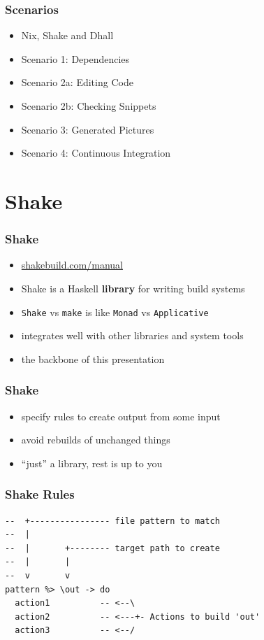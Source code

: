 \documentclass{beamer}
\begin{document}
\begin{frame}
  \frametitle{Scenarios}
  \begin{itemize}
  \item Nix, Shake and Dhall
  \item Scenario 1: Dependencies
  \item Scenario 2a: Editing Code
  \item Scenario 2b: Checking Snippets
  \item Scenario 3: Generated Pictures
  \item Scenario 4: Continuous Integration
  \end{itemize}
\end{frame}

\section{Shake}

\begin{frame}
  \frametitle{Shake}
  \begin{itemize}
  \item \url{shakebuild.com/manual}
  \item Shake is a Haskell \textbf{library} for writing build systems
  \item \texttt{Shake} vs \texttt{make} is like \texttt{Monad} vs \texttt{Applicative}
  \item integrates well with other libraries and system tools
  \item the backbone of this presentation
  \end{itemize}
\end{frame}

\begin{frame}
  \frametitle{Shake}
  \begin{itemize}
  \item specify rules to create output from some input
  \item avoid rebuilds of unchanged things
  \item ``just'' a library, rest is up to you
  \end{itemize}
\end{frame}

\begin{frame}[fragile]
  \frametitle{Shake Rules}
  \begin{verbatim}
--  +---------------- file pattern to match
--  |
--  |       +-------- target path to create
--  |       |
--  v       v
pattern %> \out -> do
  action1          -- <--\
  action2          -- <---+- Actions to build 'out'
  action3          -- <--/
  \end{verbatim}
\end{frame}
\end{document}
